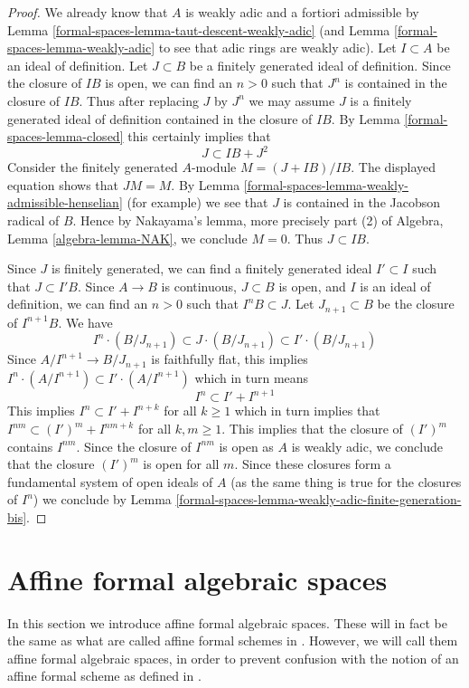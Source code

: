 \begin{proof}
We already know that $A$ is weakly adic and a fortiori admissible by
Lemma \ref{formal-spaces-lemma-taut-descent-weakly-adic}
(and Lemma \ref{formal-spaces-lemma-weakly-adic} to see that adic rings are weakly adic).
Let $I \subset A$ be an ideal of definition.
Let $J \subset B$ be a finitely generated ideal of definition.
Since the closure of $IB$ is open, we can find an $n > 0$ such that
$J^n$ is contained in the closure of $IB$. Thus after replacing $J$
by $J^n$ we may assume $J$ is a finitely generated ideal
of definition contained in the closure of $IB$. By Lemma \ref{formal-spaces-lemma-closed}
this certainly implies that
$$
J \subset IB + J^2
$$
Consider the finitely generated $A$-module $M = (J + IB)/IB$.
The displayed equation shows that $JM = M$.
By Lemma \ref{formal-spaces-lemma-weakly-admissible-henselian} (for example)
we see that $J$ is contained in the Jacobson radical of $B$.
Hence by Nakayama's lemma, more precisely part (2) of
Algebra, Lemma \ref{algebra-lemma-NAK}, we conclude $M = 0$.
Thus $J \subset IB$.

\medskip\noindent
Since $J$ is finitely generated, we can find a finitely generated
ideal $I' \subset I$ such that $J \subset I'B$.
Since $A \to B$ is continuous, $J \subset B$ is open, and
$I$ is an ideal of definition, we can find an $n > 0$ such that
$I^nB \subset J$. Let $J_{n + 1} \subset B$ be the closure of
$I^{n + 1}B$.
We have
$$
I^n \cdot (B/J_{n + 1}) \subset J \cdot (B/J_{n + 1}) \subset
I' \cdot (B/J_{n + 1})
$$
Since $A/I^{n + 1} \to B/J_{n + 1}$ is faithfully flat, this
implies $I^n \cdot (A/I^{n + 1}) \subset I' \cdot (A/I^{n + 1})$
which in turn means
$$
I^n \subset I' + I^{n + 1}
$$
This implies $I^n \subset I'  + I^{n + k}$ for all $k \geq 1$
which in turn implies that $I^{nm} \subset (I')^m + I^{nm + k}$
for all $k, m \geq 1$. This implies that the closure of
$(I')^m$ contains $I^{nm}$. Since the closure of $I^{nm}$ is open
as $A$ is weakly adic,
we conclude that the closure $(I')^m$ is open for all $m$.
Since these closures form a fundamental system of open ideals
of $A$ (as the same thing is true for the closures of $I^n$)
we conclude by Lemma \ref{formal-spaces-lemma-weakly-adic-finite-generation-bis}.
\end{proof}

\section{Affine formal algebraic spaces}
\label{formal-spaces-section-affine-formal-algebraic-spaces}
In this section we introduce affine formal algebraic spaces.
These will in fact be the same as what are called affine
formal schemes in \cite{BVGD}. However, we will call
them affine formal algebraic spaces, in order to prevent confusion with
the notion of an affine formal scheme as defined in \cite{EGA}.


